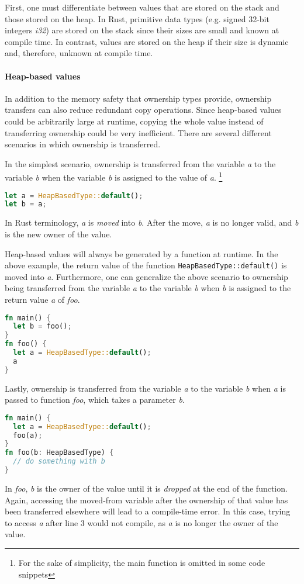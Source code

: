 \documentclass[sigplan,11pt,nonacm]{acmart}
\begin{document}
First, one must differentiate between values that are stored on the stack and those stored on the heap.
In Rust, primitive data types (e.g. signed 32-bit integers \emph{i32}) are stored on the stack since their sizes are small and known at compile time.
In contrast, values are stored on the heap if their size is dynamic and, therefore, unknown at compile time.

\paragraph{Heap-based values}

In addition to the memory safety that ownership types provide, ownership transfers can also reduce redundant copy operations.
Since heap-based values could be arbitrarily large at runtime, copying the whole value instead of transferring ownership could be very inefficient.
There are several different scenarios in which ownership is transferred.

In the simplest scenario, ownership is transferred from the variable \emph{a} to the variable \emph{b} when the variable \emph{b} is assigned to the value of \emph{a}.
\footnote{For the sake of simplicity, the main function is omitted in some code snippets}

\begin{lstlisting}[language=Rust,captionpos=b,caption={Rust simple heap-based move}]
let a = HeapBasedType::default();
let b = a;
\end{lstlisting}
In Rust terminology, \emph{a} is \emph{moved} into \emph{b}.
After the move, \emph{a} is no longer valid, and \emph{b} is the new owner of the value.

Heap-based values will always be generated by a function at runtime.
In the above example, the return value of the function \verb|HeapBasedType::default()| is moved into \emph{a}.
Furthermore, one can generalize the above scenario to ownership being transferred from the variable \emph{a} to the variable \emph{b} when \emph{b} is assigned to the return value \emph{a} of \emph{foo}.
\begin{lstlisting}[language=Rust,captionpos=b,caption={Rust heap-based move out of function}]
fn main() {
  let b = foo();
}
fn foo() {
  let a = HeapBasedType::default();
  a
}
\end{lstlisting}

Lastly, ownership is transferred from the variable \emph{a} to the variable \emph{b} when \emph{a} is passed to function \emph{foo}, which takes a parameter \emph{b}.
\begin{lstlisting}[language=Rust,captionpos=b,caption={Rust heap-based move into function}]
fn main() {
  let a = HeapBasedType::default();
  foo(a);
}
fn foo(b: HeapBasedType) {
  // do something with b
}
\end{lstlisting}
In \emph{foo}, \emph{b} is the owner of the value until it is \emph{dropped} at the end of the function.
Again, accessing the moved-from variable after the ownership of that value has been transferred elsewhere will lead to a compile-time error.
In this case, trying to access \emph{a} after line 3 would not compile, as \emph{a} is no longer the owner of the value.
\end{document}
